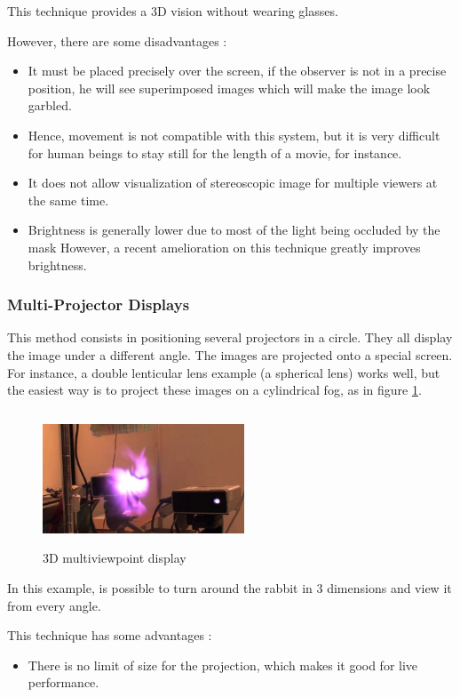 This technique provides a 3D vision without wearing glasses.

However, there are some disadvantages :
\begin{itemize}
\item It must be placed precisely over the screen, if the observer is not in a precise position, he will see superimposed images which will make the image look garbled.
\item Hence, movement is not compatible with this system, but it is very difficult for human beings to stay still for the length of a movie, for instance.
\item It does not allow visualization of stereoscopic image for multiple viewers at the same time.
\item Brightness is generally lower due to most of the light being occluded by the mask However, a recent amelioration on this technique greatly improves brightness\cite{lv2014shared}.
\end{itemize}

\subsubsection{Multi-Projector Displays}
This method consists in positioning several projectors in a circle. They all display the image under a different angle. The images are projected onto a special screen. For instance, a double lenticular lens example (a spherical lens) works well, but the easiest way is to project these images on a cylindrical fog, as in figure \ref{fig:cilfog}.

\begin{figure}[h!]
\centering\includegraphics[width=6cm,height=4cm]{image/lapin.png}
\caption{3D multiviewpoint display}
\label{fig:cilfog}
\end{figure}

In this example, is possible to turn around the rabbit in 3 dimensions and view it from every angle.

This technique has some advantages : 
\begin{itemize}
\item There is no limit of size for the projection, which makes it good for live performance.
\end{itemize}

